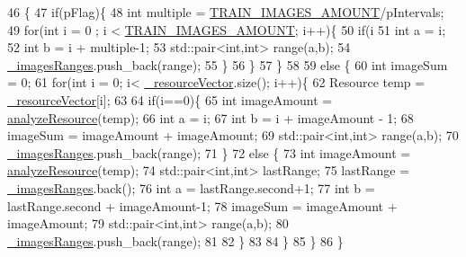 \begin{DoxyCode}
46                                                                \{
47     \textcolor{keywordflow}{if}(pFlag)\{
48             \textcolor{keywordtype}{int} multiple = \hyperlink{Config_8h_a2f82dae94103cd6733842f0fed0aeb62}{TRAIN\_IMAGES\_AMOUNT}/pIntervals;
49             \textcolor{keywordflow}{for}(\textcolor{keywordtype}{int} i = 0 ; i < \hyperlink{Config_8h_a2f82dae94103cd6733842f0fed0aeb62}{TRAIN\_IMAGES\_AMOUNT}; i++)\{
50                 \textcolor{keywordflow}{if}(i%
51                     \textcolor{keywordtype}{int} a = i;
52                     \textcolor{keywordtype}{int} b = i + multiple-1;
53                     std::pair<int,int> range(a,b);
54                     \hyperlink{classrdf_1_1ImageDispatcher_a090ae3aa3b2e08ebc0432314ef519ae6}{\_imagesRanges}.push\_back(range);
55                 \}   
56             \}
57     \}
58     
59     \textcolor{keywordflow}{else} \{
60         \textcolor{keywordtype}{int} imageSum = 0;
61         \textcolor{keywordflow}{for}(\textcolor{keywordtype}{int} i = 0; i< \hyperlink{classrdf_1_1ImageDispatcher_aee49acec382a35bd2043e14f56dce8b1}{\_resourceVector}.size(); i++)\{
62             Resource temp = \hyperlink{classrdf_1_1ImageDispatcher_aee49acec382a35bd2043e14f56dce8b1}{\_resourceVector}[i];
63             
64             \textcolor{keywordflow}{if}(i==0)\{
65                 \textcolor{keywordtype}{int} imageAmount = \hyperlink{classrdf_1_1ImageDispatcher_a0fe89ed7467fd34e1e24984b87d6d3bc}{analyzeResource}(temp);
66                 \textcolor{keywordtype}{int}    a = i;
67                 \textcolor{keywordtype}{int}    b = i + imageAmount - 1;
68                 imageSum = imageAmount  + imageAmount;
69                 std::pair<int,int> range(a,b);
70                 \hyperlink{classrdf_1_1ImageDispatcher_a090ae3aa3b2e08ebc0432314ef519ae6}{\_imagesRanges}.push\_back(range);
71             \}
72             \textcolor{keywordflow}{else} \{
73                 \textcolor{keywordtype}{int} imageAmount = \hyperlink{classrdf_1_1ImageDispatcher_a0fe89ed7467fd34e1e24984b87d6d3bc}{analyzeResource}(temp);
74                 std::pair<int,int> lastRange;
75                 lastRange = \hyperlink{classrdf_1_1ImageDispatcher_a090ae3aa3b2e08ebc0432314ef519ae6}{\_imagesRanges}.back();
76                 \textcolor{keywordtype}{int} a = lastRange.second+1;
77                 \textcolor{keywordtype}{int} b = lastRange.second + imageAmount-1;
78                 imageSum = imageAmount  + imageAmount;
79                 std::pair<int,int> range(a,b);
80                 \hyperlink{classrdf_1_1ImageDispatcher_a090ae3aa3b2e08ebc0432314ef519ae6}{\_imagesRanges}.push\_back(range);
81                 
82             \}
83             
84         \} 
85     \}
86 \}
\end{DoxyCode}
